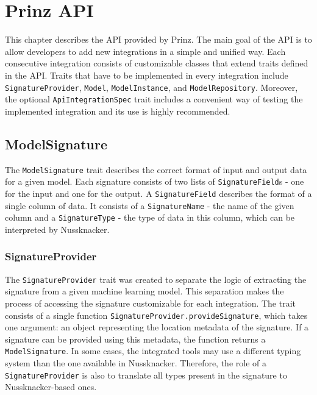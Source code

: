 \chapter{Prinz API}
\label{chap:prinz-api}

This chapter describes the API provided by Prinz.
The main goal of the API is to allow developers to add new integrations in a simple and unified way.
Each consecutive integration consists of customizable classes that extend traits defined in the API.
Traits that have to be implemented in every integration include \texttt{SignatureProvider},  \texttt{Model}, \texttt{ModelInstance}, and \texttt{ModelRepository}.
Moreover, the optional \texttt{ApiIntegrationSpec} trait includes a convenient way of testing the implemented integration and its use is highly recommended.

\section{ModelSignature}
\label{sec:model-signature}

The \texttt{ModelSignature} trait describes the correct format of input and output data for a given model.
Each signature consists of two lists of \texttt{SignatureField}s - one for the input and one for the output.
A \texttt{SignatureField} describes the format of a single column of data.
It consists of a \texttt{SignatureName} - the name of the given column and a \texttt{SignatureType} - the type of data in this column, which can be interpreted by Nussknacker.

\subsection{SignatureProvider}

The \texttt{SignatureProvider} trait was created to separate the logic of extracting the signature from a given machine learning model.
This separation makes the process of accessing the signature customizable for each integration.
The trait consists of a single function \texttt{SignatureProvider.provideSignature}, which takes one argument: an object representing the location metadata of the signature.
If a signature can be provided using this metadata, the function returns a \texttt{ModelSignature}.
In some cases, the integrated tools may use a different typing system than the one available in Nussknacker.
Therefore, the role of a \texttt{SignatureProvider} is also to translate all types present in the signature to Nussknacker-based ones.

